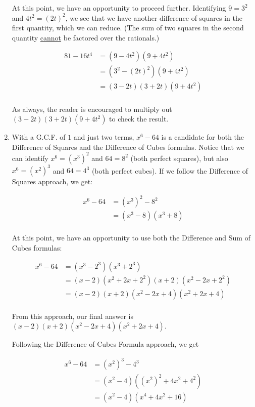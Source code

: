 \begin{ex}
\begin{enumerate}
At this point, we have an opportunity to proceed further.  Identifying $9 = 3^2$ and $4t^2 = (2t)^2$, we see that we have another difference of squares in the first quantity, which we can reduce. (The sum of two squares in the second quantity \underline{cannot} be factored over the rationals.)

\begin{align*}
81 - 16t^4 & = (9-4t^2)(9+4t^2) \\
& = (3^2 - (2t)^2) (9 + 4t^2) \\
& = (3 - 2t)(3+2t)(9 + 4t^2) \tag{Difference of Squares, $a = 3$, $b = 2t$} \\
\end{align*}

As always, the reader is encouraged to multiply out $(3 - 2t)(3+2t)(9 + 4t^2)$ to check the result.

\item  With a G.C.F. of $1$ and just two terms, $x^6 - 64$ is a candidate for both the Difference of Squares and the Difference of Cubes formulas.  Notice that we can identify $x^6 = (x^3)^2$ and $64 = 8^2$ (both perfect squares), but also $x^6 = (x^2)^3$ and $64 = 4^3$ (both perfect cubes).  If we follow the Difference of Squares approach, we get:

\begin{align*}
x^6 - 64 & = (x^3)^2 - 8^2 \\
& = (x^3 - 8)(x^3 + 8) \tag{Difference of Squares, $a = x^3$ and $b = 8$} \\
\end{align*}

At this point, we have an opportunity to use both the Difference and Sum of Cubes formulas: 

\begin{align*}
x^6 - 64 & = (x^3 - 2^3)(x^3 + 2^3) \\
& = (x-2)(x^2+2x+2^2)(x+2)(x^2 - 2x + 2^2) \tag{Sum / Difference of Cubes, $a = x$, $b = 2$} \\ 
& = (x-2)(x+2)(x^2-2x+4)(x^2+2x+4) \tag{Rearrange factors} \\ 
\end{align*}

From this approach, our final answer is $(x-2)(x+2)(x^2-2x+4)(x^2+2x+4)$.  

Following the Difference of Cubes Formula approach, we get

\begin{align*}
x^6 - 64 & = (x^2)^3 - 4^3 \\
& = (x^2 - 4)((x^2)^2 + 4x^2 + 4^2) \tag{Difference of Cubes, $a = x^2$, $b = 4$} \\ 
& = (x^2 - 4)(x^4 + 4x^2 + 16) \\ 
\end{align*}


\end{enumerate}
\end{ex}
